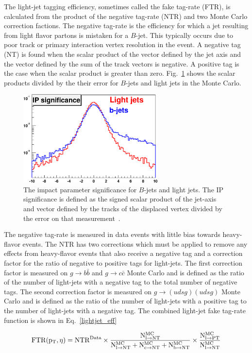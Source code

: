 The light-jet tagging efficiency, sometimes called the fake tag-rate (FTR), is calculated from the product of the negative tag-rate (NTR) and two Monte Carlo correction factions. The negative tag-rate is the efficiency for which a jet resulting from light flavor partons is mistaken for a $B$-jet. This typically occurs due to poor track or primary interaction vertex resolution in the event. A negative tag (NT) is found when the scalar product of the vector defined by the jet axis and the vector defined by the sum of the track vectors is negative. A positive tag is the case when the scalar product is greater than zero. Fig.~\ref{negativetag} shows the scalar products divided by the their error for $B$-jets and light jets in the Monte Carlo. 

\begin{figure}[!h!tbp]
\begin{center}
\includegraphics[width=0.65\textwidth]{eps/Reco/NegativeTag.eps}
\end{center}
\vspace{-0.1in}
\caption{The impact parameter significance for $B$-jets and light jets. The IP significance is defined as the signed scalar product of the jet-axis and vector defined by the tracks of the displaced vertex divided by the error on that measurement~\cite{aran}.}
\label{negativetag}
\end{figure}

The negative tag-rate is measured in data events with little bias towards heavy-flavor events. The NTR has two corrections which must be applied to remove any effects from heavy-flavor events that also receive a negative tag and a correction factor for the ratio of negative to positive tags for light-jets. The first correction factor is measured on $g\rightarrow b\bar{b}$ and $g\rightarrow c\bar{c}$ Monte Carlo and is defined as the ratio of the number of light-jets with a negative tag to the total number of negative tags. The second correction factor is measured on $g\rightarrow (udsg)(udsg)$ Monte Carlo and is defined as the ratio of the number of light-jets with a positive tag to the number of light-jets with a negative tag. The combined light-jet fake tag-rate function is shown in Eq.~\ref{lightjet_eff}

\begin{equation}
\label{lightjet_eff}
\rm{FTR}(p_{T}, \eta) = \rm{NTR}^{\rm{Data}} \times \frac{N^{\rm{MC}}_{l\rightarrow \rm{NT}}}{N^{\rm{MC}}_{l\rightarrow\rm{NT}} + N^{\rm{MC}}_{c\rightarrow\rm{NT}} + N^{\rm{MC}}_{b\rightarrow\rm{NT}} } \times \frac{N^{\rm{MC}}_{l\rightarrow\rm{PT}}}{N^{\rm{MC}}_{l\rightarrow\rm{NT}}}
\end{equation}